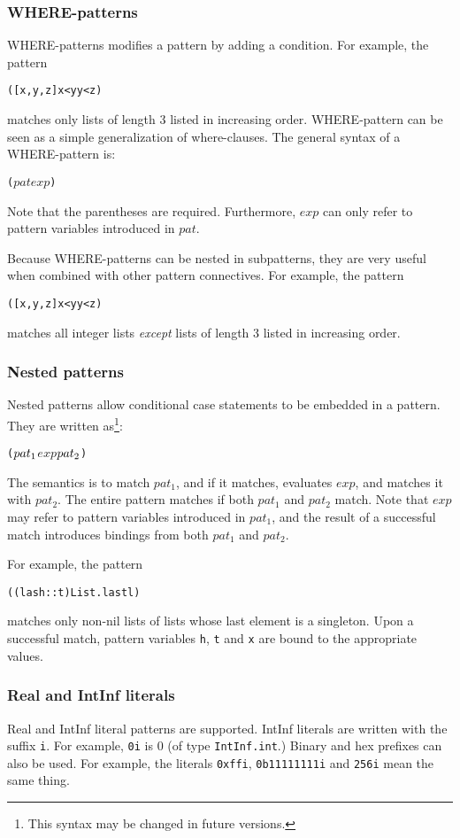 \documentclass{article}
\begin{document}
\subsubsection{WHERE-patterns} WHERE-patterns modifies a pattern by adding
a condition.  For example, the pattern
\begin{alltt}
    ([x,y,z] \WHERE x<y \ANDALSO y<z)
\end{alltt}
matches only lists of length 3 listed in increasing order.   
WHERE-pattern can be seen as a simple generalization
of where-clauses.  The general syntax of a WHERE-pattern is:
\begin{alltt}
    (\(pat\) \WHERE \(exp\))
\end{alltt}
Note that the parentheses are required.  Furthermore, $exp$ can only 
refer to pattern variables introduced in \(pat\).

Because WHERE-patterns can be nested in subpatterns, 
they are very useful when combined with other pattern connectives.
For example, the pattern
\begin{alltt}
    \NOT ([x,y,z] \WHERE x<y \ANDALSO y<z)
\end{alltt}
matches all integer lists {\em except} lists of length 3 listed in increasing order.  

\subsubsection{Nested patterns} Nested patterns allow conditional case statements to
be embedded in a pattern.  They are written as\footnote{This syntax may be 
changed in future versions.}:
\begin{alltt}
   (\(pat\sb{1}\) \WHERE \(exp\) \IN \(pat\sb{2}\))
\end{alltt}
  The semantics is to match $pat_1$, and if it matches, evaluates
$exp$, and matches it with $pat_2$.  The entire pattern matches if
both $pat_1$ and $pat_2$ match.  Note that $exp$ may refer to pattern
variables introduced in $pat_1$, and the result of a successful match introduces
bindings from both $pat_1$ and $pat_2$.

For example, the pattern
\begin{alltt}
  ((l as h::t) \WHERE List.last l \IN [x])
\end{alltt}   
matches only non-nil lists of lists whose last element is a singleton.
Upon a successful match, pattern variables \verb|h|, 
\verb|t| and \verb|x| are bound to the appropriate values.

\subsubsection{Real and IntInf literals}
 Real and IntInf literal patterns are supported.
IntInf literals are written with the suffix \verb|i|.
For example, \verb|0i| is 0 (of type \verb|IntInf.int|.)
Binary and hex prefixes can also be used.
For example, the literals \verb|0xffi|, \verb|0b11111111i|
and \verb|256i| mean the same thing.
\end{document}
